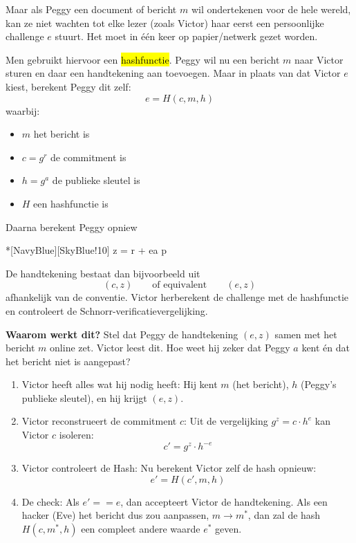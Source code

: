 Maar als Peggy een document of bericht $m$ wil ondertekenen voor de hele wereld, kan ze niet wachten tot elke lezer (zoals Victor) haar eerst een persoonlijke challenge $e$ stuurt. Het moet in één keer op papier/netwerk gezet worden.

Men gebruikt hiervoor een \hl{hashfunctie}.
Peggy wil nu een bericht $m$ naar Victor sturen en daar een handtekening aan toevoegen. Maar in plaats van dat Victor $e$ kiest, berekent Peggy dit zelf:
\begin{equation*}
    e = H(c, m, h)
\end{equation*}
waarbij:
\begin{itemize}
    \item $m$ het bericht is
    \item $c = g^r$ de commitment is
    \item $h = g^a$ de publieke sleutel is
    \item $H$ een hashfunctie is
\end{itemize}
Daarna berekent Peggy opniew
\begin{equationbox}*[NavyBlue][SkyBlue!10]
    z = r + ea \pmod p 
\end{equationbox}
De handtekening bestaat dan bijvoorbeeld uit
\begin{equation*}
    (c, z) \qquad \text{of equivalent} \qquad (e, z)
\end{equation*}
afhankelijk van de conventie. Victor herberekent de challenge met de hashfunctie en controleert de Schnorr-verificatievergelijking.

\begin{center}
\resizebox{0.9\textwidth}{!}{%
    
}
\end{center}

\textbf{Waarom werkt dit?}  \newline
Stel dat Peggy de handtekening $(e, z)$ samen met het bericht $m$ online zet. Victor leest dit. Hoe weet hij zeker dat Peggy $a$ kent én dat het bericht niet is aangepast?
\begin{enumerate}
    \item Victor heeft alles wat hij nodig heeft: Hij kent $m$ (het bericht), $h$ (Peggy's publieke sleutel), en hij krijgt $(e, z)$.
    \item Victor reconstrueert de commitment $c$: Uit de vergelijking $g^z = c \cdot h^e$ kan Victor $c$ isoleren:
    \begin{equation*}
        c' = g^z \cdot h^{-e}
    \end{equation*}
    \item Victor controleert de Hash: Nu berekent Victor zelf de hash opnieuw:
    \begin{equation*}
        e' = H(c', m, h)
    \end{equation*}
    \item De check: Als $e' == e$, dan accepteert Victor de handtekening. Als een hacker (Eve) het bericht dus zou aanpassen, $m \to m^*$, dan zal de hash $H(c, m^*, h)$ een compleet andere waarde $e^*$ geven.
\end{enumerate}

